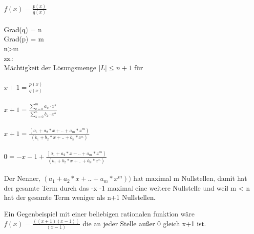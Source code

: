 \\
\(f(x)=\frac{p(x)}{q(x)}\)\\\\
Grad(q) = n \\
Grad(p) = m \\
n>m\\
zz.:\\
Mächtigkeit der Lösungsmenge \( |L| \leq n+1 \) für \\\\
\(x+1=\frac{p(x)}{q(x)}\)\\\\
\(x+1=\frac{\displaystyle\sum_{k=0}^{m} {a_k\cdot x^k}}{\displaystyle\sum_{k=0}^{n} {b_k\cdot x^k}}\)\\\\
\(x+1=\frac{(a_1+a_2*x+..+a_m*x^m)}{(b_1+b_2*x+..+b_n*x^n)}\)\\\\
\(0=-x-1+\frac{(a_1+a_2*x+..+a_m*x^m)}{(b_1+b_2*x+..+b_n*x^n)}\)\\\\


Der Nenner, \((a_1+a_2*x+..+a_m*x^m))\)
hat maximal m Nullstellen, damit hat der gesamte Term durch das -x -1 maximal eine weitere Nullstelle und weil m < n hat der gesamte Term weniger als n+1 Nullstellen.

Ein Gegenbeispiel mit einer beliebigen rationalen funktion wäre
\(f(x)=\frac{((x+1)(x-1))}{(x-1)}\)
die an jeder Stelle außer 0 gleich x+1 ist.